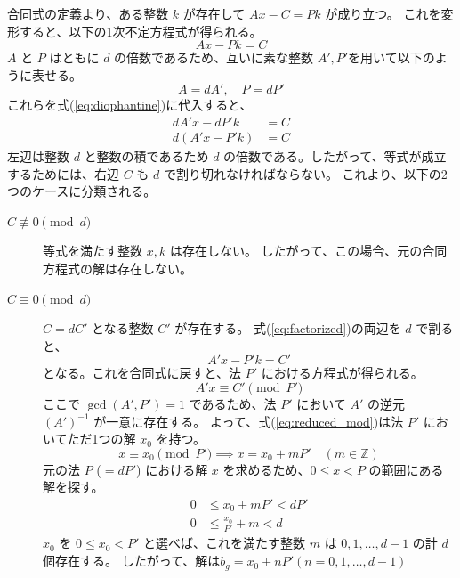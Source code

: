 \documentclass[a4paper,11pt,dvipdfmx]{jsarticle}
\theoremstyle{definition}
\begin{document}
  合同式の定義より、ある整数 $k$ が存在して $Ax - C = Pk$ が成り立つ。
  これを変形すると、以下の1次不定方程式が得られる。
  \begin{equation}
      Ax - Pk = C \label{eq:diophantine}
  \end{equation}
  $A$ と $P$ はともに $d$ の倍数であるため、互いに素な整数 $A', P'$を用いて以下のように表せる。
  \begin{equation}
      A = d A', \quad P = d P'
  \end{equation}
  これらを式(\ref{eq:diophantine})に代入すると、
  \begin{align}
      d A' x - d P' k &= C \\
      d(A' x - P' k) &= C \label{eq:factorized}
  \end{align}
  左辺は整数 $d$ と整数の積であるため $d$ の倍数である。したがって、等式が成立するためには、右辺 $C$ も $d$ で割り切れなければならない。
  これより、以下の2つのケースに分類される。
  \begin{description}
    \item[$C \not\equiv 0 \pmod d$\\]
      等式を満たす整数 $x, k$ は存在しない。
      したがって、この場合、元の合同方程式の解は存在しない。
    \item[$C \equiv 0 \pmod d$\\]
    $C = d C'$ となる整数 $C'$ が存在する。
    式(\ref{eq:factorized})の両辺を $d$ で割ると、
    \begin{equation}
      A' x - P' k = C' \label{eq:reduced}
    \end{equation}
    となる。これを合同式に戻すと、法 $P'$ における方程式が得られる。
    \begin{equation}
      A' x \equiv C' \pmod{P'} \label{eq:reduced_mod}
    \end{equation}
    ここで $\gcd(A', P') = 1$ であるため、法 $P'$ において $A'$ の逆元 $(A')^{-1}$ が一意に存在する。
    よって、式(\ref{eq:reduced_mod})は法 $P'$ においてただ1つの解 $x_0$ を持つ。
    \begin{equation*}
      x \equiv x_0 \pmod{P'} \implies x = x_0 + m P' \quad (m \in \mathbb{Z})
    \end{equation*}
    元の法 $P$ ($= d P'$) における解 $x$ を求めるため、$0 \le x < P$ の範囲にある解を探す。
    \begin{align*}
        0 &\le x_0 + m P' < d P' \\
        0 &\le \frac{x_0}{P'} + m < d
    \end{align*}
    $x_0$ を $0 \le x_0 < P'$ と選べば、これを満たす整数 $m$ は $0, 1, \dots, d-1$ の計 $d$ 個存在する。
    したがって、解は$b_g  = x_0+nP'(n=0,1,\dots,d-1)$
  \end{description}
\end{document}
